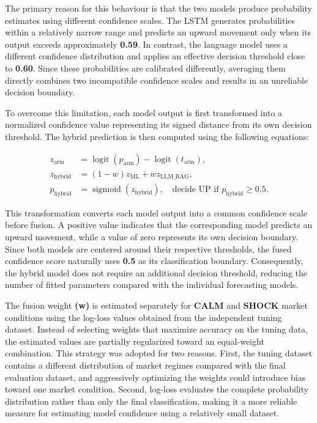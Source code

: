 The primary reason for this behaviour is that the two models produce
probability estimates using different confidence scales. The LSTM
generates probabilities within a relatively narrow range and predicts an
upward movement only when its output exceeds approximately
\textbf{0.59}. In contrast, the language model uses a different
confidence distribution and applies an effective decision threshold
close to \textbf{0.60}. Since these probabilities are calibrated
differently, averaging them directly combines two incompatible
confidence scales and results in an unreliable decision boundary.

To overcome this limitation, each model output is first transformed into
a normalized confidence value representing its signed distance from its
own decision threshold. The hybrid prediction is then computed using the
following equations:

\begin{align*}
z_{\mathrm{arm}} &= \operatorname{logit}(p_{\mathrm{arm}})-\operatorname{logit}(t_{\mathrm{arm}}),\\
z_{\mathrm{hybrid}} &= (1-w)z_{\mathrm{ML}} + w z_{\mathrm{LLM\_RAG}},\\
p_{\mathrm{hybrid}} &= \operatorname{sigmoid}(z_{\mathrm{hybrid}}), \quad \text{decide UP if } p_{\mathrm{hybrid}} \geq 0.5.
\end{align*}

This transformation converts each model output into a common confidence
scale before fusion. A positive value indicates that the corresponding
model predicts an upward movement, while a value of zero represents its
own decision boundary. Since both models are centered around their
respective thresholds, the fused confidence score naturally uses
\textbf{0.5} as its classification boundary. Consequently, the hybrid
model does not require an additional decision threshold, reducing the
number of fitted parameters compared with the individual forecasting
models.

The fusion weight \textbf{(w)} is estimated separately for \textbf{CALM}
and \textbf{SHOCK} market conditions using the log-loss values obtained
from the independent tuning dataset. Instead of selecting weights that
maximize accuracy on the tuning data, the estimated values are partially
regularized toward an equal-weight combination. This strategy was
adopted for two reasons. First, the tuning dataset contains a different
distribution of market regimes compared with the final evaluation
dataset, and aggressively optimizing the weights could introduce bias
toward one market condition. Second, log-loss evaluates the complete
probability distribution rather than only the final classification,
making it a more reliable measure for estimating model confidence using
a relatively small dataset.

